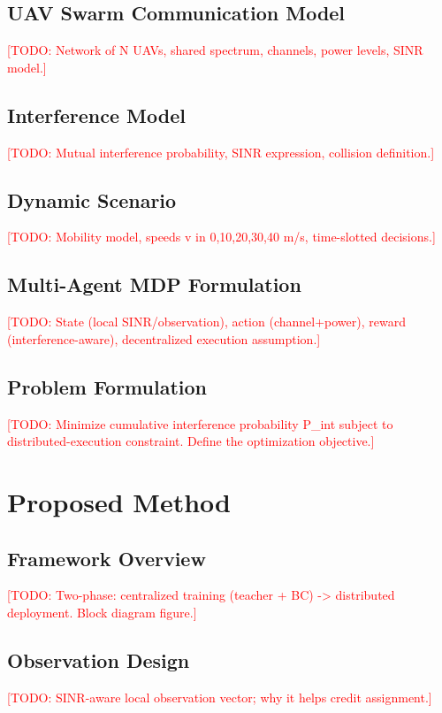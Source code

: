 \documentclass[journal]{IEEEtran}
\newcommand{\todo}[1]{\textcolor{red}{[TODO: #1]}}
\begin{document}
\subsection{UAV Swarm Communication Model}
\todo{Network of N UAVs, shared spectrum, channels, power levels, SINR model.}

\subsection{Interference Model}
\todo{Mutual interference probability, SINR expression, collision definition.}

\subsection{Dynamic Scenario}
\todo{Mobility model, speeds v in {0,10,20,30,40} m/s, time-slotted decisions.}

\subsection{Multi-Agent MDP Formulation}
\todo{State (local SINR/observation), action (channel+power), reward
(interference-aware), decentralized execution assumption.}

\subsection{Problem Formulation}
\todo{Minimize cumulative interference probability P_int subject to
distributed-execution constraint. Define the optimization objective.}

\section{Proposed Method}
\label{sec:method}

\subsection{Framework Overview}
\todo{Two-phase: centralized training (teacher + BC) -> distributed deployment.
Block diagram figure.}

\subsection{Observation Design}
\todo{SINR-aware local observation vector; why it helps credit assignment.}
\end{document}
